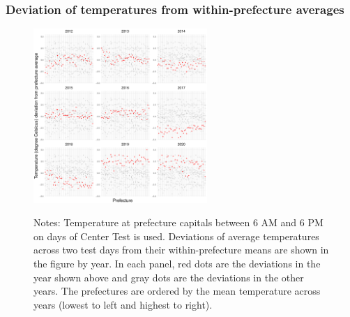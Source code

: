 \documentclass[10pt, pdfmx,hiresbb]{beamer}
\begin{document}
\begin{frame}\frametitle{Deviation of temperatures from within-prefecture averages}
  \label{temp_dev_2}
  \begin{center}
    \begin{figure}
      \includegraphics[width=6.6cm]{../Output/images/temperature_diff_by_year.pdf}
      \tiny
      \begin{tablenotes}
      \item Notes:
        Temperature at prefecture capitals between 6 AM and 6 PM on days of Center Test is used.
        Deviations of average temperatures across two test days from their within-prefecture means are shown in the figure by year.
        In each panel, red dots are the deviations in the year shown above and gray dots are the deviations in the other years.
        The prefectures are ordered by the mean temperature across years (lowest to left and highest to right). \\
      \item 
        \hyperlink{est_eq}{}
      \end{tablenotes}
    \end{figure}
  \end{center}
\end{frame}
\end{document}
